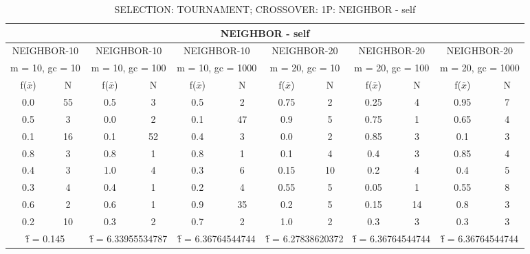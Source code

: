 \begin{table}[H]
	\centering
	\caption{SELECTION: TOURNAMENT; CROSSOVER: 1P: NEIGHBOR - self}
	\begin{adjustbox}{width=1\textwidth}
		\begin{tabular}{ |c|c||c|c||c|c||c|c||c|c||c|c| }
			\hline
			\multicolumn{12}{|c|}{NEIGHBOR - self} \\
			\hline
			\multicolumn{2}{|c||}{NEIGHBOR-10} & \multicolumn{2}{c||}{NEIGHBOR-10} & \multicolumn{2}{c||}{NEIGHBOR-10} & \multicolumn{2}{c||}{NEIGHBOR-20} & \multicolumn{2}{c||}{NEIGHBOR-20} & \multicolumn{2}{c|}{NEIGHBOR-20}\\
			\hline
			\multicolumn{2}{|c||}{m = 10, gc = 10} & \multicolumn{2}{c||}{m = 10, gc = 100} & \multicolumn{2}{c||}{m = 10, gc = 1000} & \multicolumn{2}{c||}{m = 20, gc = 10} & \multicolumn{2}{c||}{m = 20, gc = 100} & \multicolumn{2}{c|}{m = 20, gc = 1000}\\
			\hline
			f($\bar{x}$) & N & f($\bar{x}$) & N & f($\bar{x}$) & N & f($\bar{x}$) & N & f($\bar{x}$) & N & f($\bar{x}$) & N\\
			\hline
			\hline
			0.0 & 55 & 0.5 & 3 & 0.5 & 2 & 0.75 & 2 & 0.25 & 4 & 0.95 & 7\\
			0.5 & 3 & 0.0 & 2 & 0.1 & 47 & 0.9 & 5 & 0.75 & 1 & 0.65 & 4\\
			0.1 & 16 & 0.1 & 52 & 0.4 & 3 & 0.0 & 2 & 0.85 & 3 & 0.1 & 3\\
			0.8 & 3 & 0.8 & 1 & 0.8 & 1 & 0.1 & 4 & 0.4 & 3 & 0.85 & 4\\
			0.4 & 3 & 1.0 & 4 & 0.3 & 6 & 0.15 & 10 & 0.2 & 4 & 0.4 & 5\\
			0.3 & 4 & 0.4 & 1 & 0.2 & 4 & 0.55 & 5 & 0.05 & 1 & 0.55 & 8\\
			0.6 & 2 & 0.6 & 1 & 0.9 & 35 & 0.2 & 5 & 0.15 & 14 & 0.8 & 3\\
			0.2 & 10 & 0.3 & 2 & 0.7 & 2 & 1.0 & 2 & 0.3 & 3 & 0.3 & 3\\
			\hline
			\multicolumn{2}{|c||}{\^{f} = 0.145} & \multicolumn{2}{c||}{\^{f} = 6.33955534787} & \multicolumn{2}{c||}{\^{f} = 6.36764544744} & \multicolumn{2}{c||}{\^{f} = 6.27838620372} & \multicolumn{2}{c||}{\^{f} = 6.36764544744} & \multicolumn{2}{c|}{\^{f} = 6.36764544744}\\
			\hline
		\end{tabular}
	\end{adjustbox}
\end{table}
